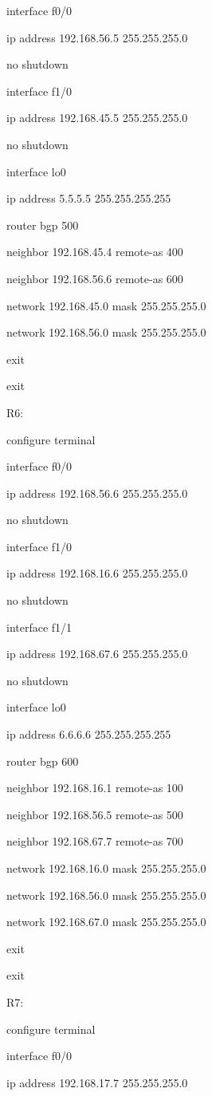 \documentclass[12pt]{article}
\begin{document}
interface f0/0

ip address 192.168.56.5 255.255.255.0

no shutdown

interface f1/0

ip address 192.168.45.5 255.255.255.0

no shutdown

interface lo0

ip address 5.5.5.5 255.255.255.255

router bgp 500

neighbor 192.168.45.4 remote-as 400

neighbor 192.168.56.6 remote-as 600

network 192.168.45.0 mask 255.255.255.0

network 192.168.56.0 mask 255.255.255.0

exit

exit

\noindent R6:

configure terminal

interface f0/0

ip address 192.168.56.6 255.255.255.0

no shutdown

interface f1/0

ip address 192.168.16.6 255.255.255.0

no shutdown

interface f1/1

ip address 192.168.67.6 255.255.255.0

no shutdown

interface lo0

ip address 6.6.6.6 255.255.255.255

router bgp 600

neighbor 192.168.16.1 remote-as 100

neighbor 192.168.56.5 remote-as 500

neighbor 192.168.67.7 remote-as 700

network 192.168.16.0 mask 255.255.255.0

network 192.168.56.0 mask 255.255.255.0

network 192.168.67.0 mask 255.255.255.0

exit

exit

\noindent R7:

configure terminal

interface f0/0

ip address 192.168.17.7 255.255.255.0
\end{document}
